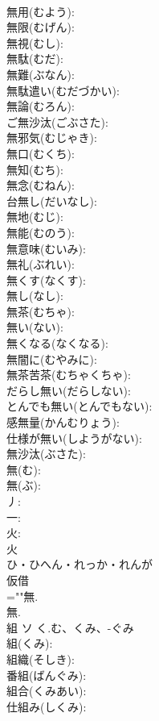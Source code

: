 \documentclass[8pt]{extreport}
\begin{document}
\begin{CJK}{UTF8}{min}
\\	無用(むよう): 
\\	無限(むげん): 
\\	無視(むし): 
\\	無駄(むだ): 
\\	無難(ぶなん): 
\\	無駄遣い(むだづかい): 
\\	無論(むろん): 
\\	ご無沙汰(ごぶさた): 
\\	無邪気(むじゃき): 
\\	無口(むくち): 
\\	無知(むち): 
\\	無念(むねん): 
\\	台無し(だいなし): 
\\	無地(むじ): 
\\	無能(むのう): 
\\	無意味(むいみ): 
\\	無礼(ぶれい): 
\\	無くす(なくす): 
\\	無し(なし): 
\\	無茶(むちゃ): 
\\	無い(ない): 
\\	無くなる(なくなる): 
\\	無闇に(むやみに): 
\\	無茶苦茶(むちゃくちゃ): 
\\	だらし無い(だらしない): 
\\	とんでも無い(とんでもない): 
\\	感無量(かんむりょう): 
\\	仕様が無い(しようがない): 
\\	無沙汰(ぶさた): 
\\	無(む): 
\\	無(ぶ): 
\\	丿: 
\\	一: 
\\	火: 
\\	火	
\\	ひ・ひへん・れっか・れんが	
\\	仮借 
\\	=""無.
\\	無.
\\	組	ソ	く.む、くみ、-ぐみ		
\\	組(くみ): 
\\	組織(そしき): 
\\	番組(ばんぐみ): 
\\	組合(くみあい): 
\\	仕組み(しくみ): 

\end{CJK}
\end{document}
